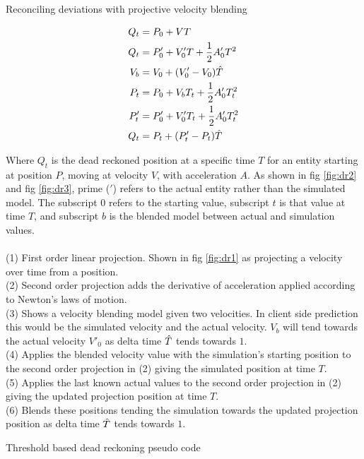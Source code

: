 \documentclass[journal]{IEEEtran}
\begin{document}
Reconciling deviations with projective velocity blending

\begin{align}
        Q_t & = P_0 + VT \\
        Q_t & = {P'_0} + {V'_0} T + \frac{1}{2} {A'_0} T^2 \\
        V_b & = V_0 + ({V'_0} - {V_0}) \Hat{T}  \\
        P_t & = P_0 + {V_b}{T_t} + \frac{1}{2} {A'_0} {T_t^2}  \\
        P'_t & = {P'_0} + {V'_0}{T_t} + \frac{1}{2}{A'_0}{T_t^2}\\
        Q_t & = P_t + ({P'_t} - P_t ) \Hat{T} 
\end{align}

Where $Q_t$ is the dead reckoned position at a specific time $T$ for an entity starting at position $P$, moving at velocity $V$, with acceleration $A$. As shown in fig \ref{fig:dr2} and fig \ref{fig:dr3}, prime ($'$) refers to the actual entity rather than the simulated model. The subscript $0$ refers to the starting value, subscript $t$ is that value at time $T$, and subscript $b$ is the blended model between actual and simulation values.
\\ \\
(1) First order linear projection. Shown in fig \ref{fig:dr1} as projecting a velocity over time from a position.\\
(2) Second order projection adds the derivative of acceleration applied according to Newton's laws of motion.\\
(3) Shows a velocity blending model given two velocities. In client side prediction this would be the simulated velocity and the actual velocity. $V_b$ will tend towards the actual velocity $V'_0$ as delta time $\Hat{T}$ tends towards $1$. \\
(4) Applies the blended velocity value with the simulation's starting position to the second order projection in (2) giving the simulated position at time $T$.\\
(5) Applies the last known actual values to the second order projection in (2) giving the updated projection position at time $T$.\\
(6) Blends these positions tending the simulation towards the updated projection position as delta time $\Hat{T}$ tends towards $1$.

\hrulefill

{\sc Threshold based dead reckoning pseudo code}

\hrulefill
\end{document}
